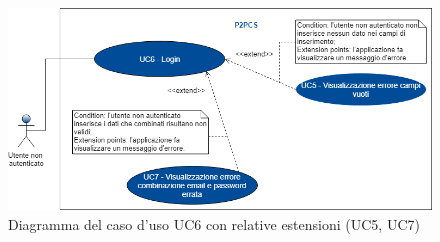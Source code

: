 \begin{figure}[h]
	\includegraphics[width=16cm]{res/images/Schemagenerale2.png}
	\centering
	\caption{Diagramma del caso d'uso UC6 con relative estensioni (UC5, UC7)}
\end{figure}
\newpage
